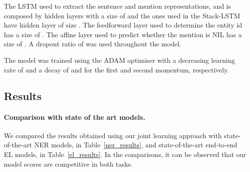 \documentclass[11pt,a4paper,dvipsnames]{article}
\begin{document}
The LSTM used to extract the sentence and mention representations,  and  is composed by  hidden layers with a size of  and the ones used in the Stack-LSTM have  hidden layer of size . The feedforward layer used to determine the entity id has a size of . The affine layer used to predict whether the mention is NIL has a size of . A dropout ratio of  was used throughout the model. 

The model was trained using the ADAM optimiser \cite{kingma2014adam} with a decreasing learning rate of  and a decay of  and  for the first and second momentum, respectively.


\subsection{Results}

\paragraph{Comparison with state of the art models.} We compared the results obtained using our joint learning approach with state-of-the-art NER models, in Table~\ref{ner_results}, and state-of-the-art end-to-end EL models, in Table~\ref{el_results}. In the comparisons, it can be observed that our model scores are competitive in both tasks. 

{
\renewcommand{\arraystretch}{1.2}
\begin{table}[h!]
\begin{centering}\small
{}
\par\end{centering}
\centering{}\caption{NER results in CoNLL 2003 test set.}
\label{ner_results}
\end{table}
}
\end{document}

